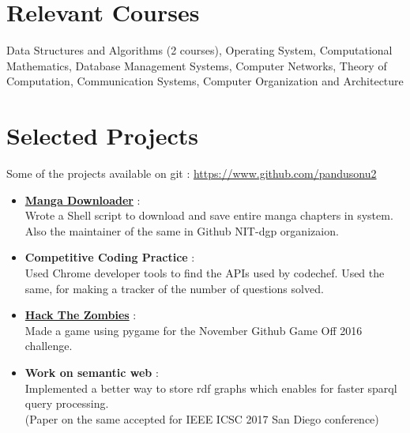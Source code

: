 \documentclass[margin, centered]{res}
\begin{document}
\begin{resume}
\section{Relevant \hspace{2mm} Courses}
Data Structures and Algorithms (2 courses), Operating System, Computational Mathematics, Database Management Systems, Computer Networks, Theory of Computation, Communication Systems, Computer Organization and Architecture

\section{Selected Projects}
Some of the projects available on git : \url{https://www.github.com/pandusonu2}
\begin{itemize}[leftmargin=*]
 \item \textbf{\href{https://github.com/NIT-dgp/manga}{Manga Downloader}} :\\
 Wrote a Shell script to download and save entire manga chapters in system. Also the maintainer of the same in Github NIT-dgp organizaion.
 \item \textbf{Competitive Coding Practice} :\\
 Used Chrome developer tools to find the APIs used by codechef. Used the same, for making a tracker of the number of questions solved.
 \item \textbf{\href{https://github.com/pandusonu2/game-off-2016}{Hack The Zombies}} :\\
 Made a game using pygame for the November Github Game Off 2016 challenge.
 \item \textbf{Work on semantic web} :\\
 Implemented a better way to store rdf graphs which enables for faster sparql query processing.\\
 (Paper on the same accepted for IEEE ICSC 2017 San Diego conference)
\end{itemize}



\end{resume}
\end{document}
